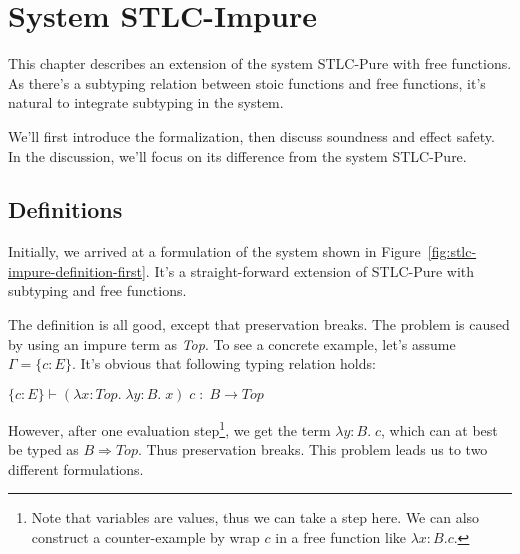 \section{System STLC-Impure}

This chapter describes an extension of the system STLC-Pure with free
functions. As there's a subtyping relation between stoic functions and
free functions, it's natural to integrate subtyping in the system.

We'll first introduce the formalization, then discuss soundness and
effect safety. In the discussion, we'll focus on its difference from
the system STLC-Pure.

\subsection{Definitions}

Initially, we arrived at a formulation of the system shown in
Figure~\ref{fig:stlc-impure-definition-first}. It's a straight-forward
extension of STLC-Pure with subtyping and free functions.

The definition is all good, except that preservation breaks. The
problem is caused by using an impure term as \emph{Top}. To see a
concrete example, let's assume $\Gamma = \{c:E\}$. It's obvious that
following typing relation holds:

\begin{center}
  $\{c:E\} \vdash (\lambda x:Top. \; \lambda y:B. \; x) \; c \; : \; B \to Top$
\end{center}

However, after one evaluation step\footnote{Note that variables are
  values, thus we can take a step here. We can also construct a
  counter-example by wrap $c$ in a free function like
  $\lambda x:B. c$.}, we get the term $\lambda y:B. \; c$, which can
at best be typed as $B \Rightarrow Top$. Thus preservation
breaks. This problem leads us to two different formulations.

